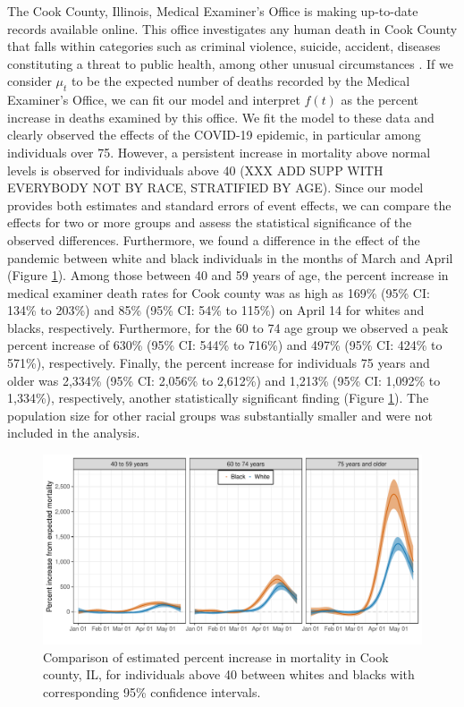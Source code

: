 \documentclass[11pt]{article}
\begin{document}
The Cook County, Illinois, Medical Examiner's Office is making up-to-date records available online. This office investigates any human death in Cook County that falls within categories such as criminal violence, suicide, accident, diseases constituting a threat to public health, among other unusual circumstances \cite{cookcovid19}. If we consider $\mu_t$ to be the expected number of deaths recorded by the Medical Examiner's Office, we can fit our model and interpret $f(t)$ as the percent increase in deaths examined by this office. We fit the model to these data and clearly observed the effects of the COVID-19 epidemic, in particular among individuals over 75. However, a persistent increase in mortality above normal levels is observed for individuals above 40 (XXX ADD SUPP WITH EVERYBODY NOT BY RACE, STRATIFIED BY AGE). Since our model provides both estimates and standard errors of event effects, we can compare the effects for two or more groups and assess the statistical significance of the observed differences. Furthermore, we found a difference in the effect of the pandemic between white and black individuals in the months of March and April (Figure \ref{fig:cook-white-v-black}). Among those between 40 and 59 years of age, the percent increase in medical examiner death rates for Cook county was as high as 169\% (95\% CI: 134\% to 203\%) and 85\%  (95\% CI: 54\% to 115\%) on April 14 for whites and blacks, respectively. Furthermore, for the 60 to 74 age group we observed a peak percent increase of 630\% (95\% CI: 544\% to 716\%) and 497\% (95\% CI: 424\% to 571\%), respectively. Finally, the percent increase for individuals 75 years and older was 2,334\% (95\% CI: 2,056\% to 2,612\%) and 1,213\% (95\% CI: 1,092\% to 1,334\%), respectively, another statistically significant finding (Figure \ref{fig:cook-white-v-black}).  The population size for other racial groups was substantially smaller and were not included in the analysis.

\begin{figure}[ht]
	\centering	
		\includegraphics[width=1\linewidth]{figs/figure-3.pdf} 
	\caption{Comparison of estimated percent increase in mortality in Cook county, IL, for individuals above 40 between whites and blacks with corresponding 95\% confidence intervals.}
	\label{fig:cook-white-v-black}
\end{figure}
\end{document}
